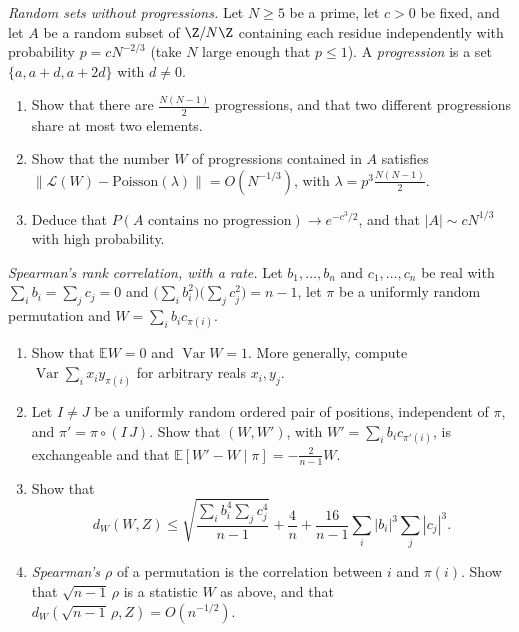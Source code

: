 \begin{exercise}[$\star\star$]\label{pb:threeap}
\emph{Random sets without progressions.} Let $N\ge5$ be a prime, let $c>0$ be fixed, and let $A$ be a random subset of $\Z/N\Z$ containing each residue independently with probability
$p=cN^{-2/3}$ (take $N$ large enough that $p\le1$). A \emph{progression} is a set $\{a,a+d,a+2d\}$ with $d\ne0$.
\begin{enumerate}[label=(\alph*)]
\item Show that there are $\frac{N(N-1)}2$ progressions, and that two different progressions share at most two elements.
\item Show that the number $W$ of progressions contained in $A$ satisfies $\|\mathcal L(W)-\text{Poisson}(\lambda)\|=O(N^{-1/3})$, with $\lambda=p^3\frac{N(N-1)}2$.
\item Deduce that $P(A\text{ contains no progression})\to e^{-c^3/2}$, and that $|A|\sim cN^{1/3}$ with high probability.
\end{enumerate}
\end{exercise}

\begin{exercise}[$\star\star\star$]\label{pb:spearman}
\emph{Spearman's rank correlation, with a rate.} Let $b_1,\dots,b_n$ and $c_1,\dots,c_n$ be real with $\sum_ib_i=\sum_jc_j=0$ and $\bigl(\sum_ib_i^2\bigr)\bigl(\sum_jc_j^2\bigr)=n-1$,
let $\pi$ be a uniformly random permutation and $W=\sum_ib_ic_{\pi(i)}$.
\begin{enumerate}[label=(\alph*)]
\item Show that $\mathbb EW=0$ and $\operatorname{Var}W=1$. More generally, compute $\operatorname{Var}\sum_ix_iy_{\pi(i)}$ for arbitrary reals $x_i,y_j$.
\item Let $I\ne J$ be a uniformly random ordered pair of positions, independent of $\pi$, and $\pi'=\pi\circ(I\,J)$. Show that $(W,W')$, with
$W'=\sum_ib_ic_{\pi'(i)}$, is exchangeable and that $\mathbb E[W'-W\mid\pi]=-\frac2{n-1}W$.
\item Show that
\[
d_W(W,Z)\le\sqrt{\frac{\sum_ib_i^4\sum_jc_j^4}{n-1}}+\frac4n+\frac{16}{n-1}\sum_i|b_i|^3\sum_j|c_j|^3.
\]
\item \emph{Spearman's $\rho$} of a permutation is the correlation between $i$ and $\pi(i)$. Show that $\sqrt{n-1}\,\rho$ is a statistic $W$ as above, and that
$d_W(\sqrt{n-1}\,\rho,Z)=O(n^{-1/2})$.
\end{enumerate}
\end{exercise}


